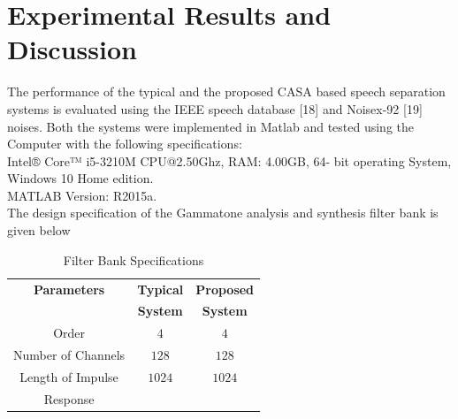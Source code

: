 \documentclass[a4paper]{article}
\begin{document}
\section{Experimental Results and Discussion}
The performance of the typical and the proposed CASA based speech separation systems is evaluated using the IEEE speech database [18] and Noisex-92 [19] noises. Both the systems were implemented in Matlab and tested using the Computer with the following specifications:\\
Intel® Core™ i5-3210M CPU@2.50Ghz, RAM: 4.00GB, 64- bit operating System, Windows 10 Home edition.\\
MATLAB Version: R2015a. \\
The design specification of the Gammatone analysis and synthesis filter bank is given below
\begin{table}[th]
  \caption{Filter Bank Specifications}
  \label{tab:word_styles}
  \centering
  \begin{tabular}{|c|c|c|}
    \hline
    \textbf{Parameters}        & \textbf{Typical}                            & \textbf{Proposed}\\
															 & \textbf{System} 													   & \textbf{System}\\
    \hline
    Order                      & $4$                                         & $4$    \\
		\hline
    Number of Channels         & $128$                                       & $128$  \\
		\hline
    Length of Impulse          & $1024$                                      & $1024$ \\
		Response									 &																						 &        \\
		\hline
  \end{tabular}
\end{table}
\end{document}
